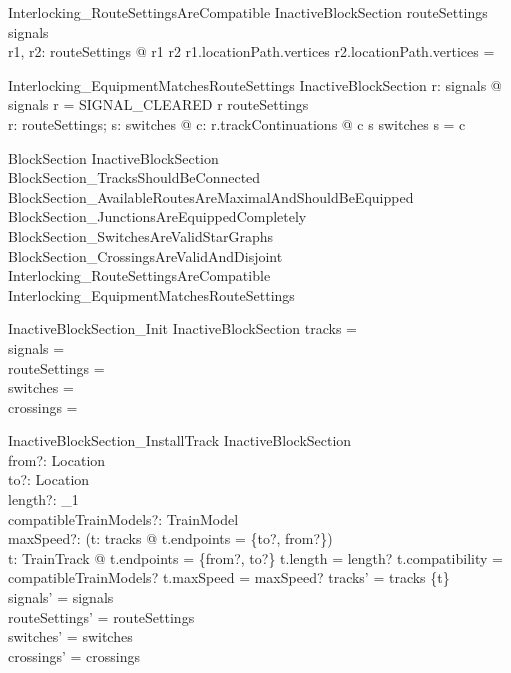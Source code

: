 \begin{schema}{Interlocking\_RouteSettingsAreCompatible}
  InactiveBlockSection
\where
  routeSettings \subseteq  \dom  signals\\
  \forall  r1, r2: routeSettings @ r1 \neq  r2 \implies  r1.locationPath.vertices \cap  r2.locationPath.vertices = \emptyset
\end{schema}

\begin{schema}{Interlocking\_EquipmentMatchesRouteSettings}
  InactiveBlockSection
\where
  \forall  r: \dom  signals @ signals r = SIGNAL\_CLEARED \iff  r \in  routeSettings\\
  \forall  r: routeSettings; s: \dom  switches @ \forall  c: r.trackContinuations @ c \in  s \implies  switches s = c
\end{schema}

\begin{schema}{BlockSection}
  InactiveBlockSection\\
  BlockSection\_TracksShouldBeConnected\\
  BlockSection\_AvailableRoutesAreMaximalAndShouldBeEquipped\\
  BlockSection\_JunctionsAreEquippedCompletely\\
  BlockSection\_SwitchesAreValidStarGraphs\\
  BlockSection\_CrossingsAreValidAndDisjoint\\
  Interlocking\_RouteSettingsAreCompatible\\
  Interlocking\_EquipmentMatchesRouteSettings
\end{schema}

\begin{schema}{InactiveBlockSection\_Init}
  InactiveBlockSection
\where
  tracks = \emptyset\\
  signals = \emptyset\\
  routeSettings = \emptyset\\
  switches = \emptyset\\
  crossings = \emptyset
\end{schema}

\begin{schema}{InactiveBlockSection\_InstallTrack}
  \Delta InactiveBlockSection\\
  from?: Location\\
  to?: Location\\
  length?: \nat _1{}\\
  compatibleTrainModels?: \finset  TrainModel\\
  maxSpeed?: \nat 
\where
  \lnot  (\exists  t: tracks @ t.endpoints = \{to?, from?\})\\
  \exists  t: TrainTrack @ t.endpoints = \{from?, to?\} \land  t.length = length? \land  t.compatibility = compatibleTrainModels? \land  t.maxSpeed = maxSpeed? \land  tracks' = tracks \cup  \{t\}\\
  signals' = signals\\
  routeSettings' = routeSettings\\
  switches' = switches\\
  crossings' = crossings
\end{schema}

